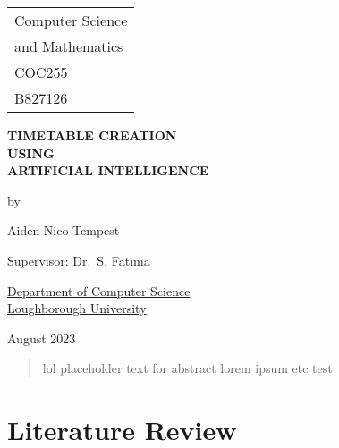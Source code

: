 \documentclass[a4paper, 12pt]{report}
\begin{document}

\thispagestyle{empty}

\fancypage{}{\fbox}

\begin{center}

	\Large{
		\hfill \begin{tabular}{l}
			Computer Science \\ and Mathematics \\ COC255 \\ B827126
		\end{tabular}
	}

	\vspace*{\fill}

	\Large{\textbf{TIMETABLE CREATION \\ USING \\ARTIFICIAL INTELLIGENCE}}

	\vspace*{\fill}

	by

	\vspace*{\fill}

	Aiden Nico Tempest

	\vspace*{\fill}

	Supervisor: Dr.\ S. Fatima

	\vspace*{\fill}

	\underline{Department of Computer Science} \\ \underline{Loughborough
	University}

	\vspace*{\fill}
	
	August 2023

\end{center} %

\newpage

\fancypage{}{}  %

\begin{abstract}
	lol placeholder text for abstract lorem ipsum etc test
\end{abstract}

\tableofcontents

\newpage

\chapter{Literature Review}
\end{document}
